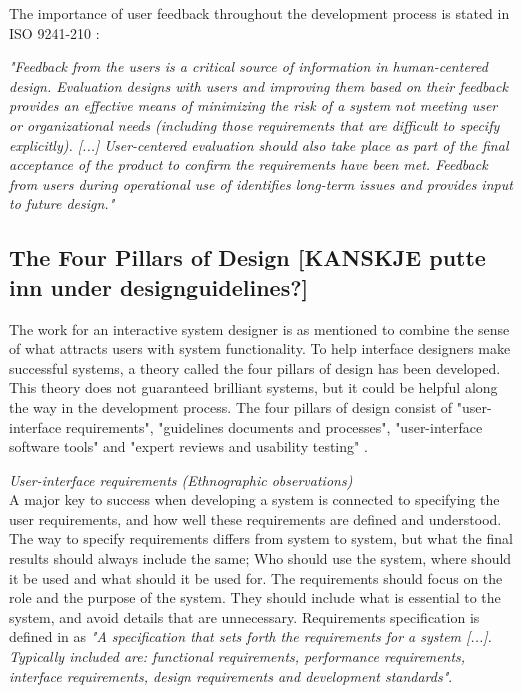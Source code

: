 The importance of user feedback throughout the development process is stated in ISO 9241-210 \cite{dis20109241}:

\emph{"Feedback from the users is a critical source of information in human-centered design. Evaluation designs with users and improving them based on their feedback provides an effective means of minimizing the risk of a system not meeting user or organizational needs (including those requirements that are difficult to specify explicitly).  [...] User-centered evaluation should also take place as part of the final acceptance of the product to confirm the requirements have been met. Feedback from users during operational use of identifies long-term issues and provides input to future design."}
  
\subsection{The Four Pillars of Design [KANSKJE putte inn under designguidelines?]}
The work for an interactive system designer is as mentioned to combine the sense of what attracts users with system functionality. To help interface designers make successful systems, a theory called the four pillars of design has been developed. This theory does not guaranteed brilliant systems, but it could be helpful along the way in the development process. The four pillars of design consist of "user-interface requirements", "guidelines documents and processes", "user-interface software tools" and "expert reviews and usability testing" \cite{mmi}.    

\emph{User-interface requirements (Ethnographic observations)}\\
A major key to success when developing a system is connected to specifying the user requirements, and how well these requirements are defined and understood.  The way to specify requirements differs from system to system, but what the final results should always include the same; Who should use the system, where should it be used and what should it be used for. The requirements should focus on the role and the purpose of the system. They should include what is essential to the system, and avoid details that are unnecessary. Requirements specification is defined in \cite{systemutviklingDel1} as \emph{"A specification that sets forth the requirements for a system [...]. Typically included are: functional requirements, performance requirements, interface requirements, design requirements and development standards"}. 


